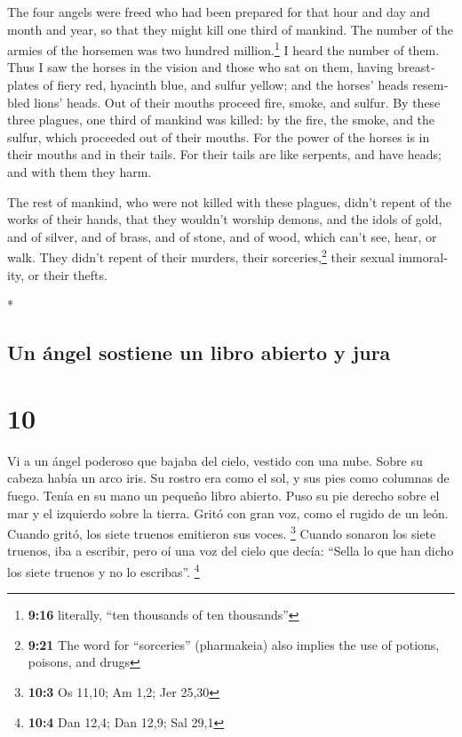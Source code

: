 \begin{paracol}{2}
\begin{otherlanguage}{english}
 The four angels were freed who had been prepared for
that hour and day and month and year, so that they might kill one third
of mankind.  The number of the armies of the horsemen was
two hundred million.\footnote{\textbf{9:16} literally, ``ten thousands
  of ten thousands''} I heard the number of them.  Thus I
saw the horses in the vision and those who sat on them, having
breastplates of fiery red, hyacinth blue, and sulfur yellow; and the
horses' heads resembled lions' heads. Out of their mouths proceed fire,
smoke, and sulfur.  By these three plagues, one third of
mankind was killed: by the fire, the smoke, and the sulfur, which
proceeded out of their mouths.  For the power of the
horses is in their mouths and in their tails. For their tails are like
serpents, and have heads; and with them they harm.

 The rest of mankind, who were not killed with these
plagues, didn't repent of the works of their hands, that they wouldn't
worship demons, and the idols of gold, and of silver, and of brass, and
of stone, and of wood, which can't see, hear, or walk. 
They didn't repent of their murders, their sorceries,\footnote{\textbf{9:21}
  The word for ``sorceries'' (pharmakeia) also implies the use of
  potions, poisons, and drugs} their sexual immorality, or their thefts.

\end{otherlanguage}

\switchcolumn[0]*

\hypertarget{un-uxe1ngel-sostiene-un-libro-abierto-y-jura}{%
\subsection{Un ángel sostiene un libro abierto y
jura}\label{un-uxe1ngel-sostiene-un-libro-abierto-y-jura}}

\hypertarget{section-18}{%
\section{10}\label{section-18}}

 Vi a un ángel poderoso que bajaba del cielo, vestido con
una nube. Sobre su cabeza había un arco iris. Su rostro era como el sol,
y sus pies como columnas de fuego.  Tenía en su mano un
pequeño libro abierto. Puso su pie derecho sobre el mar y el izquierdo
sobre la tierra.  Gritó con gran voz, como el rugido de un
león. Cuando gritó, los siete truenos emitieron sus voces. \footnote{\textbf{10:3}
  Os 11,10; Am 1,2; Jer 25,30}  Cuando sonaron los siete
truenos, iba a escribir, pero oí una voz del cielo que decía: ``Sella lo
que han dicho los siete truenos y no lo escribas''. \footnote{\textbf{10:4}
  Dan 12,4; Dan 12,9; Sal 29,1}


\end{paracol}
